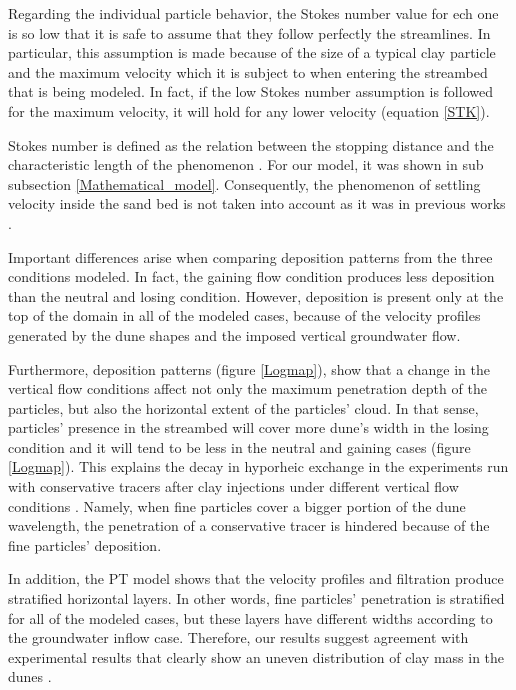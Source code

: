 \documentclass[draft,linenumbers]{agujournal2018}
\begin{document}
Regarding the individual particle behavior, the Stokes number value for ech one is so low that it is safe to assume that they follow perfectly the streamlines. In particular, this assumption is made because of the size of a typical clay particle and the maximum velocity which it is subject to when entering the streambed that is being modeled. In fact, if the low Stokes number assumption is followed for the maximum velocity, it will hold for any lower velocity (equation \ref{STK}).

Stokes number is defined as the relation between the stopping distance and the characteristic length of the phenomenon \citep{Clark2009}. For our model, it was shown in sub subsection \ref{Mathematical_model}. Consequently, the phenomenon of settling velocity inside the sand bed is not taken into account as it was in previous works \citep{Packman2000}.

Important differences arise when comparing deposition patterns from the three conditions modeled. In fact, the gaining flow condition produces less deposition than the neutral and losing condition. However, deposition is present only at the top of the domain in all of the modeled cases, because of the velocity profiles generated by the dune shapes and the imposed vertical groundwater flow.

Furthermore, deposition patterns (figure \ref{Logmap}), show that a change in the vertical flow conditions affect not only the maximum penetration depth of the particles, but also the horizontal extent of the particles' cloud. In that sense, particles' presence in the streambed will cover more dune's width in the losing condition and it will tend to be less in the neutral and gaining cases (figure \ref{Logmap}). This explains the decay in hyporheic exchange in the experiments run with conservative tracers after clay injections under different vertical flow conditions \citep{Fox2014,Fox2018}. Namely, when fine particles cover a bigger portion of the dune wavelength, the penetration of a conservative tracer is hindered because of the fine particles' deposition. 

In addition, the PT model shows that the velocity profiles and filtration produce stratified horizontal layers. In other words, fine particles' penetration is stratified for all of the modeled cases, but these layers have different widths according to the groundwater inflow case. Therefore, our results suggest agreement with experimental results that clearly show an uneven distribution of clay mass in the dunes \citep{Fox2018}.
\end{document}
